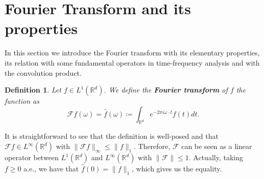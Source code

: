 \documentclass[corpo=11pt, stile=classica, tipotesi=custom,
greek, evenboxes, english]{toptesi}
\numberwithin{equation}{chapter}
\newtheorem{defi}[teo]{Definition}
\theoremstyle{definition}
\theoremstyle{remark}
\newcommand{\R}{\mathbb{R}} %
\newcommand{\F}{\mathscr{F}} %
\begin{document}
\section{Fourier Transform and its properties}\label{Fourier transform and its properties section}
In this section we introduce the Fourier transform with its elementary properties, its relation with some fundamental operators in time-frequency analysis and with the convolution product.
\begin{defi}\label{Fourier transform def}
	Let $f \in L^1(\R^d)$. We define the \textbf{Fourier transform} of $f$ the function as
	\begin{equation}\label{Fourier transform formula}
		\F f(\omega) = \hat{f}(\omega) \coloneqq \int_{\R^d} e^{-2 \pi i \omega \cdot t} f(t) dt.
	\end{equation}
\end{defi}
It is straightforward to see that the definition is well-posed and that $\F f \in L^{\infty}(\R^d)$ with $\|\F f\|_{\infty} \leq \| f \|_1$. Therefore, $\F$ can be seen as a linear operator between $L^1(\R^d)$ and $L^{\infty}(\R^d)$ with $\| \F \| \leq 1$. Actually, taking $f \geq 0$ a.e.,  we have that $\hat{f}(0) = \| f \|_1$, which gives us the equality.
\end{document}
